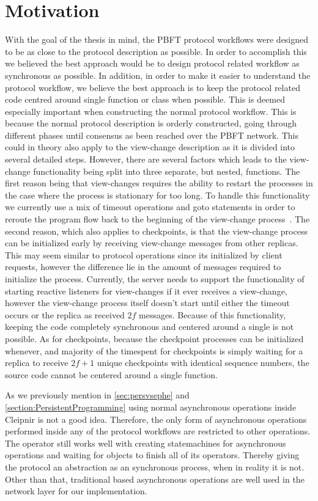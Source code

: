 \section{Motivation}
With the goal of the thesis in mind, the PBFT protocol workflows were designed to be as close to the protocol description as possible. In order to accomplish this we believed the best approach would be to design protocol related workflow as synchronous as possible. In addition, in order to make it easier to understand the protocol workflow, we believe the best approach is to keep the protocol related code centred around single function or class when possible. This is deemed especially important when constructing the normal protocol workflow. This is because the normal protocol description is orderly constructed, going through different phases until consensus as been reached over the PBFT network. This could in theory also apply to the view-change description as it is divided into several detailed steps. However, there are several factors which leads to the view-change functionality being split into three separate, but nested, functions. The first reason being that view-changes requires the ability to restart the processes in the case where the process is stationary for too long. To handle this functionality we currently use a mix of timeout operations and goto statements in order to reroute the program flow back to the beginning of the view-change process~\cite{WEB:goto}. The second reason, which also applies to checkpoints, is that the view-change process can be initialized early by receiving view-change messages from other replicas. This may seem similar to protocol operations since its initialized by client requests, however the difference lie in the amount of messages required to initialize the process. Currently, the server needs to support the functionality of starting reactive listeners for view-changes if it ever receives a view-change, however the view-change process itself doesn't start until either the timeout occurs or the replica as received $2f$ messages. Because of this functionality, keeping the code completely synchronous and centered around a single is not possible. As for checkpoints, because the checkpoint processes can be initialized whenever, and majority of the timespent for checkpoints is simply waiting for a replica to receive $2f+1$ unique checkpoints with identical sequence numbers, the source code cannot be centered around a single function.

As we previously mention in \autoref{sec:persvsephe} and \autoref{section:PersistentProgramming} using normal asynchronous operations inside Cleipnir is not a good idea. Therefore, the only form of asynchronous operations performed inside any of the protocol workflows are restricted to other  operations. The  operator still works well with creating statemachines for asynchronous  operations and waiting for  objects to finish all of its operators. Thereby giving the protocol an abstraction as an synchronous process, when in reality it is not. Other than that, traditional  based asynchronous operations are well used in the network layer for our implementation. 

